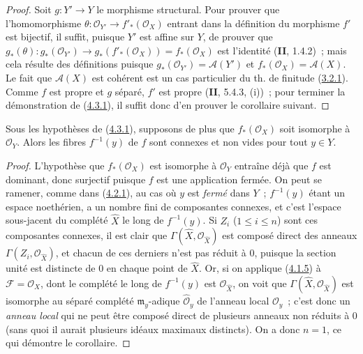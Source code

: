\begin{proof}
Soit $g:Y'\to Y$ le morphisme structural. Pour prouver que l'homomorphisme
$\theta:\mathcal O_{Y'}\to f'_*(\mathcal O_X)$ entrant dans la définition
du morphisme $f'$ est bijectif, il suffit, puisque $Y'$ est affine sur $Y$,
de prouver que
$g_*(\theta):g_*(\mathcal O_{Y'})\longrightarrow
g_*(f'_*(\mathcal O_X))=f_*(\mathcal O_X)$
est l'identité (\textbf{II}, 1.4.2)~; mais cela résulte des définitions puisque
$g_*(\mathcal O_{Y'})=\mathcal A(Y')$ et
$f_*(\mathcal O_X)=\mathcal A(X)$. Le fait que $\mathcal A(X)$ est
cohérent est un cas particulier du th. de finitude
(\hyperref[III.3.2.1-fr]{3.2.1}). Comme $f$ est propre et $g$ séparé,
$f'$ est propre (\textbf{II}, 5.4.3, (i))~; pour terminer la démonstration de
(\hyperref[III.4.3.1-fr]{4.3.1}), il suffit donc d'en prouver le corollaire
suivant.
\end{proof}

\begin{corollary}[4.3.2]
\label{III.4.3.2-fr}
Sous les hypothèses de \textup{(\hyperref[III.4.3.1-fr]{4.3.1})}, supposons de plus
que $f_*(\mathcal O_X)$ soit isomorphe à $\mathcal O_Y$. Alors les fibres
$f^{-1}(y)$ de $f$ sont connexes et non vides pour tout $y\in Y$.
\end{corollary}

\begin{proof}
L'hypothèse que $f_*(\mathcal O_X)$ est isomorphe à $\mathcal O_Y$
entraîne déjà que $f$ est dominant, donc surjectif puisque $f$ est une
application fermée. On peut se ramener, comme dans
(\hyperref[III.4.2.1-fr]{4.2.1}), au cas où $y$ est \emph{fermé} dans $Y$~;
$f^{-1}(y)$ étant un espace noethérien, a un nombre fini de composantes
connexes, et c'est l'espace sous-jacent du complété $\widehat X$ le long de
$f^{-1}(y)$. Si $Z_i$ ($1\leq i\leq n$) sont ces composantes connexes, il
est clair que $\Gamma(\widehat X,\mathcal O_{\widehat X})$ est composé
direct des anneaux $\Gamma(Z_i,\mathcal O_{\widehat X})$, et chacun de ces
derniers n'est pas réduit à $0$, puisque la section unité est distincte de
$0$ en chaque point de $\widehat X$. Or, si on applique
(\hyperref[III.4.1.5-fr]{4.1.5}) à $\mathcal F=\mathcal O_X$, dont le
complété le long de $f^{-1}(y)$ est $\mathcal O_{\widehat X}$, on voit que
$\Gamma(\widehat X,\mathcal O_{\widehat X})$ est isomorphe au séparé
complété $\mathfrak m_y$-adique $\widehat{\mathcal O}_y$ de l'anneau local
$\mathcal O_y$~; c'est donc un \emph{anneau local} qui ne peut être composé
direct de plusieurs anneaux non réduits à $0$ (sans quoi il aurait
plusieurs idéaux maximaux distincts). On a donc $n=1$, ce qui démontre le
corollaire.
\end{proof}

